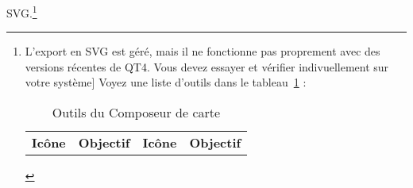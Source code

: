 SVG.\footnote{L'export en SVG est géré, mais il ne fonctionne pas proprement
avec des versions récentes de QT4. Vous devez essayer et vérifier
indivuellement sur votre système] Voyez une liste d'outils dans le
tableau~\ref{tab:printcomposer_tools} :

\begin{table}[h]
\centering
\caption{Outils du Composeur de carte}\label{tab:printcomposer_tools}\medskip
 \begin{tabular}{|l|p{6.9cm}|l|p{6.9cm}|}
 \hline \textbf{Icône} & \textbf{Objectif} & \textbf{Icône} &
 \textbf{Objectif} \\
 

\end{tabular}
\end{table}}
